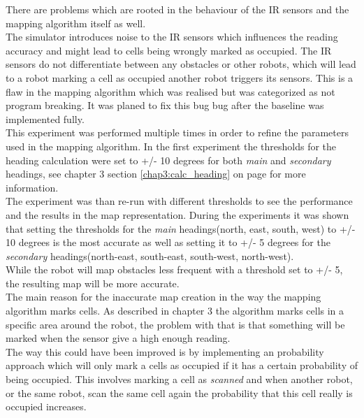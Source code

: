 There are problems which are rooted in the behaviour of the IR sensors and the mapping algorithm itself as well.\\
The simulator introduces noise to the IR sensors which influences the reading accuracy and might lead to cells being wrongly marked as occupied. 
The IR sensors do not differentiate between any obstacles or other robots, 
which will lead to a robot marking a cell as occupied another robot triggers its sensors. This is a flaw in the mapping algorithm which was realised but was categorized as not program breaking. It was planed to fix this bug bug after the baseline was implemented fully. \\ 

This experiment was performed multiple times in order to refine the parameters used in the mapping algorithm. In the first experiment the thresholds for the heading calculation were set to +/- 10 degrees for both \textit{main} and \textit{secondary} headings, see chapter 3 section \ref{chap3:calc_heading} on page \pageref{chap3:calc_heading} for more information. \\
The experiment was than re-run with different thresholds to see the performance and the results in the map representation. 
During the experiments it was shown that setting the thresholds for the \textit{main} headings(north, east, south, west) to +/- 10 degrees is the most accurate as well as setting it to +/- 5 degrees for the \textit{secondary} headings(north-east, south-east, south-west, north-west).\\
While the robot will map obstacles less frequent with a threshold set to +/- 5, the resulting map will be more accurate. \\

The main reason for the inaccurate map creation in the way the mapping algorithm marks cells. As described in chapter 3 the algorithm marks cells in a specific area around the robot, the problem with that is that something will be marked when the sensor give a high enough reading. \\
The way this could have been improved is by implementing an probability approach which will only mark a cells as occupied if it has a certain probability of being occupied. This involves marking a cell as \textit{scanned} and when another robot, or the same robot, scan the same cell again the probability that this cell really is occupied increases. 

